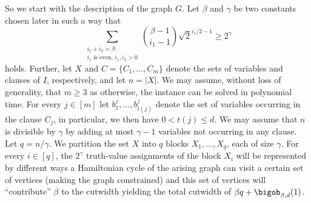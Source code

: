 \documentclass[a4paper,UKenglish,cleveref, autoref, thm-restate]{lipics-v2021}
\begin{document}
So we start with the description of the graph $G$.
Let $\beta$ and $\gamma$ be two constants chosen later in such a way that 
\begin{equation}\label{eq:desired-ineq-hc-lb}
	\sum_{\substack{i_1 + i_2 = \beta \colon \\ i_1 \text{ is even, } i_1, i_2 > 0}} {\beta - 1 \choose i_1 - 1} \sqrt{2}^{i_1/2 - 1} \geq 2^\gamma
\end{equation}
holds.
Further, let $X$ and $C = \{C_1, \dots, C_m\}$ denote the sets of variables and clauses of $I$, respectively, and let $n = |X|$.
We may assume, without loss of generality, that $m \geq 3$ as otherwise, the instance can be solved in polynomial time.
For every $j \in [m]$ let $b^j_1, \dots, b^j_{t(j)}$ denote the set of variables occurring in the clause $C_j$, in particular, we then have $0 < t(j) \leq d$.
We may assume that $n$ is divisible by $\gamma$ by adding at most $\gamma - 1$ variables not occurring in any clause.
Let $q = n / \gamma$.
We partition the set $X$ into $q$ blocks $X_1, \dots, X_q$, each of size $\gamma$.
For every $i \in [q]$, the $2^\gamma$ truth-value assignments of the block $X_i$ will be represented by different ways a Hamiltonian cycle of the arising graph can visit a certain set of vertices (making the graph constrained) and this set of vertices will ``contribute'' $\beta$ to the cutwidth yielding the total cutwidth of $\beta q + \bigoh_{\beta, d}(1)$.
\end{document}
